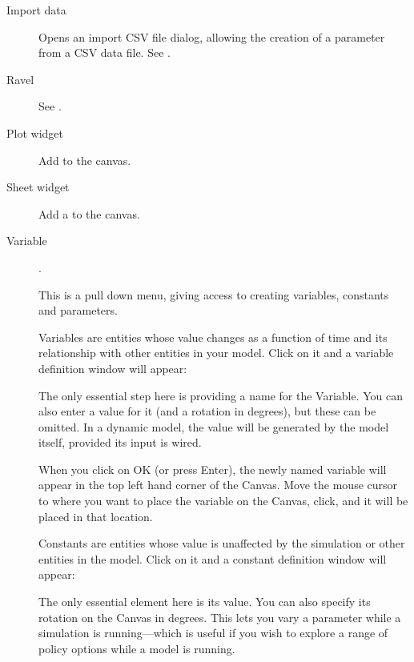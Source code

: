 \begin{description}
\item[Import data] Opens an import CSV file dialog, allowing the
  creation of a parameter from a CSV data file. See
  .

\item[Ravel] See .
  
\item[Plot widget]  Add  to the canvas.

\item[Sheet widget]  Add a  to the canvas.

\item[Variable]  . \label{Variable}

This is a pull down menu, giving access to creating variables,
constants and parameters.

  Variables are entities
whose value changes as a function of time and its relationship with
other entities in your model. Click on it and a variable definition
window will appear:

\begin{center}
\end{center}

The only essential step here is providing a name for the Variable. You
can also enter a value for it (and a rotation in degrees), but these
can be omitted. In a dynamic model, the value will be generated by the
model itself, provided its input is wired.


When you click on OK (or press Enter), the newly named variable will
appear in the top left hand corner of the Canvas. Move the mouse
cursor to where you want to place the variable on the Canvas, click,
and it will be placed in that location.


Constants are entities whose
value is unaffected by the simulation or other entities in the
model. Click on it and a constant definition window will appear:

\begin{center}
\end{center}

The only essential element here is its
value. You can also specify its rotation on the Canvas in degrees. This lets you vary a
parameter while a simulation is running---which is useful if you wish
to explore a range of policy options while a model is running.


\end{description}
